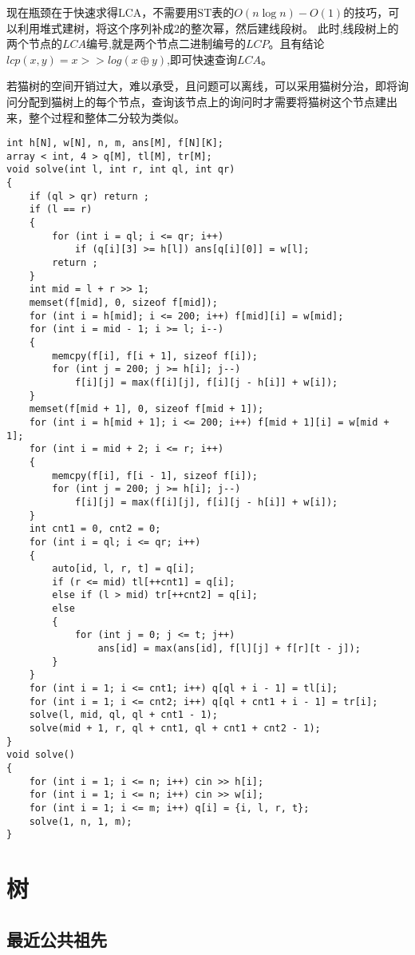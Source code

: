 \documentclass[a4paper,fontset=none]{ctexart}
\begin{document}
现在瓶颈在于快速求得$\text{LCA}$，不需要用$\text{ST}$表的$O(n\log n)-O(1)$的技巧，可以利用堆式建树，将这个序列补成$2$的整次幂，然后建线段树。
此时,线段树上的两个节点的$LCA$编号,就是两个节点二进制编号的$LCP$。且有结论$lcp(x,y)=x>>log(x\oplus y)$,即可快速查询$LCA$。

若猫树的空间开销过大，难以承受，且问题可以离线，可以采用猫树分治，即将询问分配到猫树上的每个节点，查询该节点上的询问时才需要将猫树这个节点建出来，整个过程和整体二分较为类似。
\begin{verbatim}
int h[N], w[N], n, m, ans[M], f[N][K];
array < int, 4 > q[M], tl[M], tr[M];
void solve(int l, int r, int ql, int qr)
{
    if (ql > qr) return ;
    if (l == r)
    {
        for (int i = ql; i <= qr; i++)
            if (q[i][3] >= h[l]) ans[q[i][0]] = w[l];
        return ;
    }
    int mid = l + r >> 1;
    memset(f[mid], 0, sizeof f[mid]);
    for (int i = h[mid]; i <= 200; i++) f[mid][i] = w[mid];
    for (int i = mid - 1; i >= l; i--)
    {
        memcpy(f[i], f[i + 1], sizeof f[i]);
        for (int j = 200; j >= h[i]; j--)
            f[i][j] = max(f[i][j], f[i][j - h[i]] + w[i]);
    }
    memset(f[mid + 1], 0, sizeof f[mid + 1]);
    for (int i = h[mid + 1]; i <= 200; i++) f[mid + 1][i] = w[mid + 1];
    for (int i = mid + 2; i <= r; i++)
    {
        memcpy(f[i], f[i - 1], sizeof f[i]);
        for (int j = 200; j >= h[i]; j--)
            f[i][j] = max(f[i][j], f[i][j - h[i]] + w[i]);
    }
    int cnt1 = 0, cnt2 = 0;
    for (int i = ql; i <= qr; i++)
    {
        auto[id, l, r, t] = q[i];
        if (r <= mid) tl[++cnt1] = q[i];
        else if (l > mid) tr[++cnt2] = q[i];
        else
        {
            for (int j = 0; j <= t; j++)
                ans[id] = max(ans[id], f[l][j] + f[r][t - j]);
        }
    }
    for (int i = 1; i <= cnt1; i++) q[ql + i - 1] = tl[i];
    for (int i = 1; i <= cnt2; i++) q[ql + cnt1 + i - 1] = tr[i];
    solve(l, mid, ql, ql + cnt1 - 1);
    solve(mid + 1, r, ql + cnt1, ql + cnt1 + cnt2 - 1);
}
void solve()
{
    for (int i = 1; i <= n; i++) cin >> h[i];
    for (int i = 1; i <= n; i++) cin >> w[i];
    for (int i = 1; i <= m; i++) q[i] = {i, l, r, t};
    solve(1, n, 1, m);
}
\end{verbatim}

\section{树}
\subsection{最近公共祖先}
\end{document}
